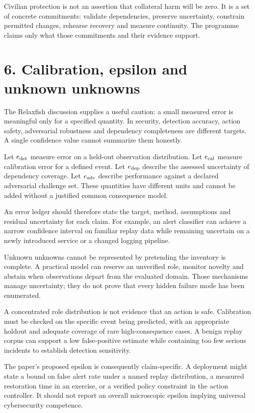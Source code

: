 \documentclass[11pt]{article}
\begin{document}
Civilian protection is not an assertion that collateral harm will be zero. It is a set of concrete commitments: validate dependencies, preserve uncertainty, constrain permitted changes, rehearse recovery and measure continuity. The programme claims only what those commitments and their evidence support.

\clearpage
\section*{6. Calibration, epsilon and unknown unknowns}
The Relaxfish discussion supplies a useful caution: a small measured error is meaningful only for a specified quantity. In security, detection accuracy, action safety, adversarial robustness and dependency completeness are different targets. A single confidence value cannot summarize them honestly.

Let $e_{\rm det}$ measure error on a held-out observation distribution. Let $e_{\rm cal}$ measure calibration error for a defined event. Let $e_{\rm dep}$ describe the assessed uncertainty of dependency coverage. Let $e_{\rm adv}$ describe performance against a declared adversarial challenge set. These quantities have different units and cannot be added without a justified common consequence model.

An error ledger should therefore state the target, method, assumptions and residual uncertainty for each claim. For example, an alert classifier can achieve a narrow confidence interval on familiar replay data while remaining uncertain on a newly introduced service or a changed logging pipeline.

Unknown unknowns cannot be represented by pretending the inventory is complete. A practical model can reserve an unverified role, monitor novelty and abstain when observations depart from the evaluated domain. Those mechanisms manage uncertainty; they do not prove that every hidden failure mode has been enumerated.

A concentrated role distribution is not evidence that an action is safe. Calibration must be checked on the specific event being predicted, with an appropriate holdout and adequate coverage of rare high-consequence cases. A benign replay corpus can support a low false-positive estimate while containing too few serious incidents to establish detection sensitivity.

The paper's proposed epsilon is consequently claim-specific. A deployment might state a bound on false alert rate under a named replay distribution, a measured restoration time in an exercise, or a verified policy constraint in the action controller. It should not report an overall microscopic epsilon implying universal cybersecurity competence.
\end{document}

